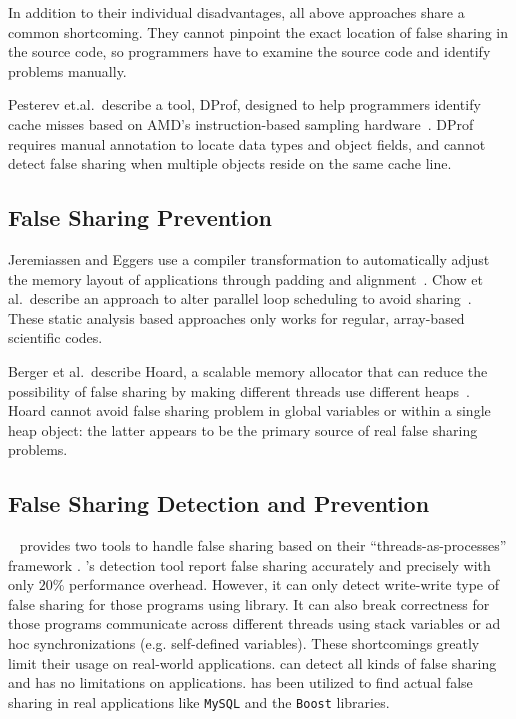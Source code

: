 In addition to their individual disadvantages,
all above approaches share a common shortcoming. 
They cannot pinpoint the exact location of false sharing in the source code, so programmers have to examine the source code and identify problems manually.

Pesterev et.al.\ describe a tool, DProf, designed to help programmers identify cache misses based on AMD's instruction-based sampling hardware~\cite{DProf}. DProf requires manual annotation to locate data types and object fields, and cannot detect false sharing when multiple objects reside on the same cache line.

\subsection{False Sharing Prevention}
Jeremiassen and Eggers use a compiler transformation to automatically adjust the memory layout of applications through padding and alignment~\cite{falseshare:compile}. Chow et al.\ describe an approach to alter parallel loop scheduling to avoid
sharing~\cite{falseshare:schedule}. These static analysis based approaches only works for regular, array-based scientific codes.

Berger et al.\ describe Hoard, a scalable memory allocator that can reduce the possibility of false sharing by making different threads use different heaps~\cite{Hoard}. Hoard cannot avoid false sharing problem in global variables or within
a single heap object: the latter appears to be the primary source of real false sharing problems.

\subsection{False Sharing Detection and Prevention}
\sheriff{}~\cite{sheriff} provides two tools to handle false sharing based on their ``threads-as-processes'' framework .
\Sheriff{}'s detection tool report false sharing accurately and precisely with only $20\%$ performance overhead.
However, it can only detect write-write type of false sharing for those programs using \pthreads{} library. It can also break correctness for those programs communicate across different threads using stack variables or ad hoc synchronizations (e.g. self-defined variables). These shortcomings greatly limit their usage on real-world applications.  
\Predator{} can detect all kinds of false sharing and has no limitations on applications. \Predator{} has been utilized to find actual false sharing in real applications like \texttt{MySQL} and the \texttt{Boost} libraries.

